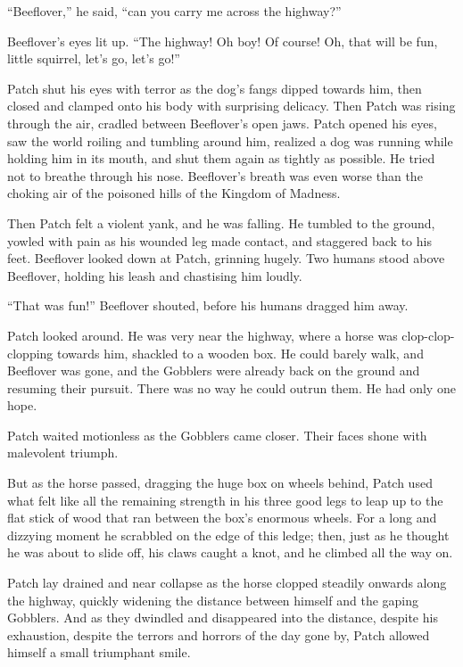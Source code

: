 \documentclass[ebook,oneside,openany,17pt]{memoir}
\newenvironment{tolerant}[1]{%
  \par\tolerance=#1\relax
}{%
  \par
}
\begin{document}
“Beeflover,” he said, “can you carry me across the highway?”

Beeflover’s eyes lit up. “The highway! Oh boy! Of course! Oh, that
will be fun, little squirrel, let’s go, let’s go!”

\begin{tolerant}{1000}
Patch shut his eyes with terror as the dog’s fangs dipped towards him,
then closed and clamped onto his body with surprising delicacy. Then
Patch was rising through the air, cradled between Beeflover’s open
jaws. Patch opened his eyes, saw the world roiling and tumbling around
him, realized a dog was running while holding him in its mouth, and
shut them again as tightly as possible. He tried not to breathe
through his nose. Beeflover’s breath was even worse than the choking
air of the poisoned hills of the Kingdom of Madness.
\end{tolerant}

Then Patch felt a violent yank, and he was falling. He tumbled to the
ground, yowled with pain as his wounded leg made contact, and
staggered back to his feet. Beeflover looked down at Patch, grinning
hugely. Two humans stood above Beeflover, holding his leash and
chastising him loudly.

“That was fun!” Beeflover shouted, before his humans dragged him away.

Patch looked around. He was very near the highway, where a horse was
clop-clop-clopping towards him, shackled to a wooden box. He could
barely walk, and Beeflover was gone, and the Gobblers were already
back on the ground and resuming their pursuit. There was no way he
could outrun them. He had only one hope.

Patch waited motionless as the Gobblers came closer. Their faces shone
with malevolent triumph.

But as the horse passed, dragging the huge box on wheels behind, Patch
used what felt like all the remaining strength in his three good legs
to leap up to the flat stick of wood that ran between the box’s
enormous wheels. For a long and dizzying moment he scrabbled on the
edge of this ledge; then, just as he thought he was about to slide
off, his claws caught a knot, and he climbed all the way on.

Patch lay drained and near collapse as the horse clopped steadily
onwards along the highway, quickly widening the distance between
himself and the gaping Gobblers. And as they dwindled and disappeared
into the distance, despite his exhaustion, despite the terrors and
horrors of the day gone by, Patch allowed himself a small triumphant
smile.
\end{document}
